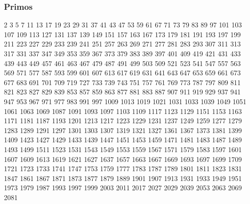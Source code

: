 \documentclass[10pt,landscape,twocolumn,a4paper,notitlepage]{article}
\begin{document}
\subsubsection{Primos}
2 3 5 7 11 13 17 19 23 29
31 37 41 43 47 53 59 61 67 71
73 79 83 89 97 101 103 107 109 113
127 131 137 139 149 151 157 163 167 173
179 181 191 193 197 199 211 223 227 229
233 239 241 251 257 263 269 271 277 281
283 293 307 311 313 317 331 337 347 349
353 359 367 373 379 383 389 397 401 409
419 421 431 433 439 443 449 457 461 463
467 479 487 491 499 503 509 521 523 541
547 557 563 569 571 577 587 593 599 601
607 613 617 619 631 641 643 647 653 659
661 673 677 683 691 701 709 719 727 733
739 743 751 757 761 769 773 787 797 809
811 821 823 827 829 839 853 857 859 863
877 881 883 887 907 911 919 929 937 941
947 953 967 971 977 983 991 997 1009 1013
1019 1021 1031 1033 1039 1049 1051 1061 1063 1069
1087 1091 1093 1097 1103 1109 1117 1123 1129 1151
1153 1163 1171 1181 1187 1193 1201 1213 1217 1223
1229 1231 1237 1249 1259 1277 1279 1283 1289 1291
1297 1301 1303 1307 1319 1321 1327 1361 1367 1373
1381 1399 1409 1423 1427 1429 1433 1439 1447 1451
1453 1459 1471 1481 1483 1487 1489 1493 1499 1511
1523 1531 1543 1549 1553 1559 1567 1571 1579 1583
1597 1601 1607 1609 1613 1619 1621 1627 1637 1657
1663 1667 1669 1693 1697 1699 1709 1721 1723 1733
1741 1747 1753 1759 1777 1783 1787 1789 1801 1811
1823 1831 1847 1861 1867 1871 1873 1877 1879 1889
1901 1907 1913 1931 1933 1949 1951 1973 1979 1987
1993 1997 1999 2003 2011 2017 2027 2029 2039 2053
2063 2069 2081

\end{document}
